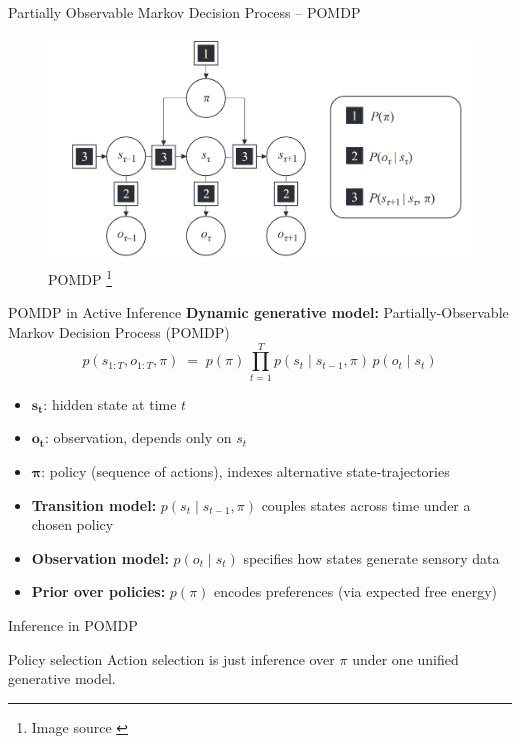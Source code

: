 \documentclass[aspectratio=1610, english]{beamer}
\begin{document}
\begin{frame}{Partially Observable Markov Decision Process -- POMDP}
    \begin{figure}
        \centering
        \includegraphics[width=1.0\linewidth]{img/pomd_graphical_model.png}
        \caption{POMDP \footnote{Image source \cite{active-inference-book}}}
        \label{fig:pomd}
    \end{figure}
\end{frame}

\begin{frame}{POMDP in Active Inference}
  \textbf{Dynamic generative model:} Partially-Observable Markov Decision Process (POMDP)
  \[
    p(s_{1:T},o_{1:T},\pi)
      \;=\; p(\pi)\,\prod_{t=1}^T p(s_t \mid s_{t-1},\pi)\,p(o_t\mid s_t)
  \]
  \medskip
  \begin{itemize}
    \item \(\mathbf{s_t}\): hidden state at time \(t\)  
    \item \(\mathbf{o_t}\): observation, depends only on \(s_t\)  
    \item \(\boldsymbol\pi\): policy (sequence of actions), indexes alternative state‐trajectories  
    \item \textbf{Transition model:} \(p(s_t\mid s_{t-1},\pi)\) couples states across time under a chosen policy  
    \item \textbf{Observation model:} \(p(o_t\mid s_t)\) specifies how states generate sensory data  
    \item \textbf{Prior over policies:} \(p(\pi)\) encodes preferences (via expected free energy)  
  \end{itemize}
\end{frame}

\begin{frame}{Inference in POMDP}
    \begin{block}{Policy selection}
        Action selection is just inference over \(\pi\) under one unified generative model.
    \end{block}
\end{frame}
\end{document}
